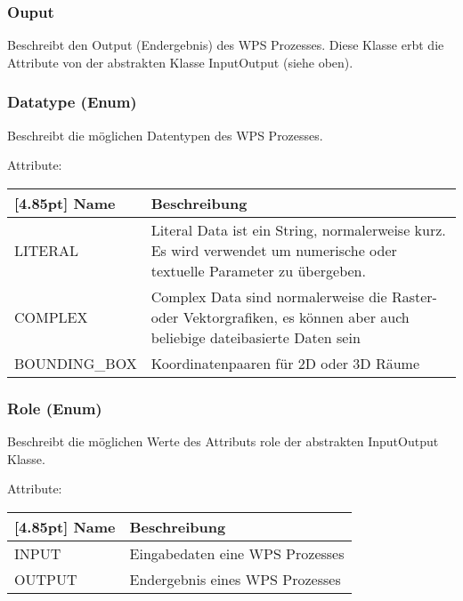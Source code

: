 		\subsubsection{Ouput}
			Beschreibt den Output (Endergebnis) des WPS Prozesses. \newline
			Diese Klasse erbt die Attribute von der abstrakten Klasse InputOutput (siehe oben).
 
		\subsubsection{Datatype (Enum)}	
			Beschreibt die möglichen Datentypen des WPS Prozesses. \newline
			
			Attribute:
			\begin{center}
				\setlength\tabcolsep{5pt}
				\renewcommand{\arraystretch}{1.5}
				
				\begin{tabularx}{\textwidth}{|l|X|}
					\hline
					\rowcolor[gray]{0.75}[4.85pt] 
					Name & Beschreibung \\ \hline 
			   		LITERAL &  Literal Data ist ein String, normalerweise kurz. Es wird verwendet um numerische oder textuelle Parameter zu übergeben.   \\ \hline
			   		COMPLEX & Complex Data sind normalerweise die Raster- oder Vektorgrafiken, es können aber auch beliebige dateibasierte Daten sein \\ \hline
			   		BOUNDING_BOX & Koordinatenpaaren für 2D oder 3D Räume \\ \hline
				\end{tabularx}
			\end{center}

		\subsubsection{Role (Enum)}
			Beschreibt die möglichen Werte des Attributs role der abstrakten InputOutput Klasse. \newline
			
			Attribute:
			\begin{center}
				\setlength\tabcolsep{5pt}
				\renewcommand{\arraystretch}{1.5}
				
				\begin{tabularx}{\textwidth}{|l|X|}
					\hline
					\rowcolor[gray]{0.75}[4.85pt]
					Name & Beschreibung \\ \hline 
			   		INPUT & Eingabedaten eine WPS Prozesses \\ \hline
			   		OUTPUT & Endergebnis eines WPS Prozesses \\ \hline
				\end{tabularx}
			\end{center}

